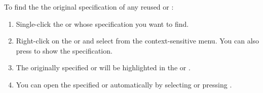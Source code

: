 To find the the original specification of any reused \gdcase{} or \gdsuite{}:
\begin{enumerate}
\item Single-click the \gdcase{} or \gdsuite{} whose specification you want to find.
\item Right-click on the \gdcase{} or \gdsuite{} and select  from the context-sensitive menu. You can also press  to show the specification.
\item The originally specified  \gdcase{} or \gdsuite{} will be highlighted in the \gdtestcasebrowser{} or \gdtestsuitebrowser{}. 
\item You can open the specified \gdcase{} or \gdsuite{} automatically by selecting  or pressing .
\end{enumerate}
